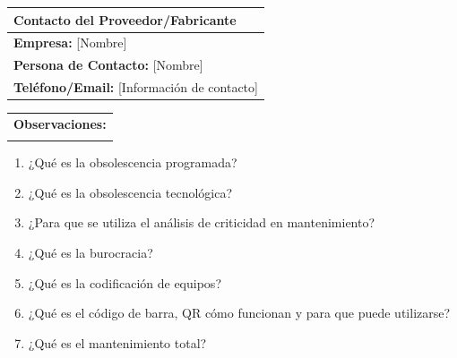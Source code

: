 \documentclass[../main]{subfiles}
\begin{document}
\begin{center}
\vspace{0.3cm}

\begin{tabular}{|p{}|}
\hline
\textbf{Contacto del Proveedor/Fabricante} \\ \hline
\textbf{Empresa:} [Nombre] \\ 
\textbf{Persona de Contacto:} [Nombre] \\ 
\textbf{Teléfono/Email:} [Información de contacto] \\ \hline
\end{tabular}

\vspace{0.3cm}

\begin{tabular}{|p{}|}
\hline
\textbf{Observaciones:} \\ 
\vspace{1cm} \\ \hline
\end{tabular}
\end{center}

\begin{enumerate}
  \item  ¿Qué es la obsolescencia programada?
  \item ¿Qué es la obsolescencia tecnológica?
  \item ¿Para que se utiliza el análisis de criticidad en mantenimiento?
  \item ¿Qué es la burocracia?
  \item ¿Qué es la codificación de equipos?
  \item ¿Qué es el código de barra, QR cómo funcionan y para que
    puede utilizarse?
  \item ¿Qué es el mantenimiento total?

\end{enumerate}
\end{document}
